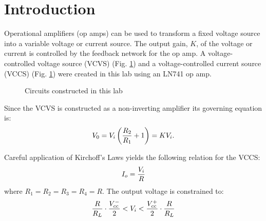 \section{Introduction}\label{sec:intro}
Operational amplifiers (op amps) can be used to transform a fixed voltage source into a variable voltage or current source.
The output gain, $K$, of the voltage or current is controlled by the feedback network for the op amp.
A voltage-controlled voltage source (VCVS) (Fig. \ref{fig:schematics}) and a voltage-controlled current source (VCCS) (Fig. \ref{fig:schematics}) were created in this lab using an LN741 op amp.
\begin{figure}[htpb!]
	\centering
	\caption{Circuits constructed in this lab \cite[p. 17]{lab-manual}}
	\label{fig:schematics}
\end{figure}

Since the VCVS is constructed as a non-inverting amplifier its governing equation is:
\begin{equation}\label{eq:vcvs}
	V_0 = V_i \left( {R_2 \over R_1} + 1 \right) = K V_i.
\end{equation}

Careful application of Kirchoff's Laws yields the following relation for the VCCS:
\begin{equation*}\label{eq:vccs}
	I_o = {V_i \over R}
\end{equation*}
where $R_1 = R_2 = R_3 = R_4 = R$.
The output voltage is constrained to:
\begin{equation}\label{eq:max-vccs}
	\frac{R}{R_L} \cdot {V_{cc}^- \over 2} < V_i < {V_{cc}^+ \over 2} \cdot \frac{R}{R_L}
\end{equation}
